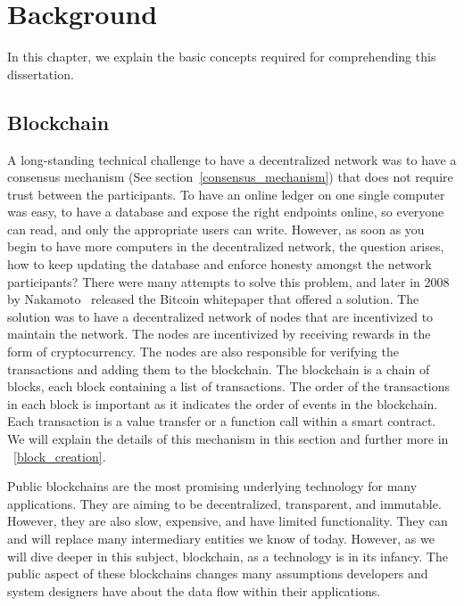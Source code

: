 


\chapter{Background} \label{sec:background}


In this chapter, we explain the basic concepts required for comprehending this dissertation.



\section{Blockchain}
A long-standing technical challenge to have a decentralized network was to have a consensus mechanism (See section~\ref{consensus_mechanism}) that does not require trust between the participants. To have an online ledger on one single computer was easy, to have a database and expose the right endpoints online, so everyone can read, and only the appropriate users can write. However, as soon as you begin to have more computers in the decentralized network, the question arises, how to keep updating the database and enforce honesty amongst the network participants? There were many attempts to solve this problem, and later in 2008 by Nakamoto~\cite{nakamoto2008bitcoin} released the Bitcoin whitepaper that offered a solution. The solution was to have a decentralized network of nodes that are incentivized to maintain the network. The nodes are incentivized by receiving rewards in the form of cryptocurrency. The nodes are also responsible for verifying the transactions and adding them to the blockchain. The blockchain is a chain of blocks, each block containing a list of transactions. The order of the transactions in each block is important as it indicates the order of events in the blockchain. Each transaction is a value transfer or a function call within a smart contract. We will explain the details of this mechanism in this section and further more in ~\ref{block_creation}.

Public blockchains are the most promising underlying technology for many applications. They are aiming to be decentralized, transparent, and immutable. However, they are also slow, expensive, and have limited functionality. They can and will replace many intermediary entities we know of today. However, as we will dive deeper in this subject, blockchain, as a technology is in its infancy. The public aspect of these blockchains changes many assumptions developers and system designers have about the data flow within their applications. 


